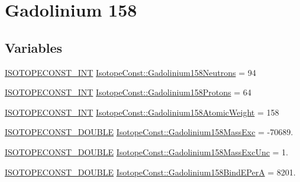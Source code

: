 \hypertarget{group___isotope_const-_gadolinium-_gd158}{}\section{Gadolinium 158}
\label{group___isotope_const-_gadolinium-_gd158}
\subsection*{Variables}
\begin{DoxyCompactItemize}
\item 
\mbox{\hyperlink{group___isotope_const-_macros_ga5f18360b3e99483a35c32d789e62621c}{I\+S\+O\+T\+O\+P\+E\+C\+O\+N\+S\+T\+\_\+\+I\+NT}} \mbox{\hyperlink{group___isotope_const-_gadolinium-_gd158_ga1e52e6b097016e9915847048584fb257}{Isotope\+Const\+::\+Gadolinium158\+Neutrons}} = 94
\item 
\mbox{\hyperlink{group___isotope_const-_macros_ga5f18360b3e99483a35c32d789e62621c}{I\+S\+O\+T\+O\+P\+E\+C\+O\+N\+S\+T\+\_\+\+I\+NT}} \mbox{\hyperlink{group___isotope_const-_gadolinium-_gd158_gaa09da307b8b6f53a686780274d48d94a}{Isotope\+Const\+::\+Gadolinium158\+Protons}} = 64
\item 
\mbox{\hyperlink{group___isotope_const-_macros_ga5f18360b3e99483a35c32d789e62621c}{I\+S\+O\+T\+O\+P\+E\+C\+O\+N\+S\+T\+\_\+\+I\+NT}} \mbox{\hyperlink{group___isotope_const-_gadolinium-_gd158_gad67436e5b3302be167da8adae10c523a}{Isotope\+Const\+::\+Gadolinium158\+Atomic\+Weight}} = 158
\item 
\mbox{\hyperlink{group___isotope_const-_macros_ga8f45a7272ce02c0b4c65c44636ed719a}{I\+S\+O\+T\+O\+P\+E\+C\+O\+N\+S\+T\+\_\+\+D\+O\+U\+B\+LE}} \mbox{\hyperlink{group___isotope_const-_gadolinium-_gd158_gabfe9a8ccfbe496636c179046c4a859a7}{Isotope\+Const\+::\+Gadolinium158\+Mass\+Exc}} = -\/70689.
\item 
\mbox{\hyperlink{group___isotope_const-_macros_ga8f45a7272ce02c0b4c65c44636ed719a}{I\+S\+O\+T\+O\+P\+E\+C\+O\+N\+S\+T\+\_\+\+D\+O\+U\+B\+LE}} \mbox{\hyperlink{group___isotope_const-_gadolinium-_gd158_ga9bdd69900a2fcd1bfae24375f9a39c32}{Isotope\+Const\+::\+Gadolinium158\+Mass\+Exc\+Unc}} = 1.
\item 
\mbox{\hyperlink{group___isotope_const-_macros_ga8f45a7272ce02c0b4c65c44636ed719a}{I\+S\+O\+T\+O\+P\+E\+C\+O\+N\+S\+T\+\_\+\+D\+O\+U\+B\+LE}} \mbox{\hyperlink{group___isotope_const-_gadolinium-_gd158_gae020b59696fb111ffdd55b3f88141760}{Isotope\+Const\+::\+Gadolinium158\+Bind\+E\+PerA}} = 8201.

\end{DoxyCompactItemize}
